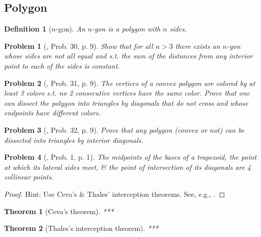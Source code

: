 \documentclass[oneside]{book}
\numberwithin{equation}{section}
\newtheorem{definition}{Definition}[section]
\newtheorem{problem}{Problem}[section]
\newtheorem{theorem}{Theorem}[section]
\begin{document}
\subsection{Polygon}

\begin{definition}[$n$-gon]
	An \emph{$n$-gon} is a polygon with $n$ sides.
\end{definition}

\begin{problem}[\cite{Gelca_Andreescu2017}, Prob. 30, p. 9]
	Show that for all $n > 3$ there exists an $n$-gon whose sides are not all equal and s.t. the sum of the distances from any interior point to each of the sides is constant.
\end{problem}

\begin{problem}[\cite{Gelca_Andreescu2017}, Prob. 31, p. 9]
	The vertices of a convex polygon are colored by at least 3 colors s.t. no 2 consecutive vertices have the same color. Prove that one can dissect the polygon into triangles by diagonals that do not cross and whose endpoints have different colors.
\end{problem}

\begin{problem}[\cite{Gelca_Andreescu2017}, Prob. 32, p. 9]
	Prove that any polygon (convex or not) can be dissected into triangles by interior diagonals.
\end{problem}

\begin{problem}[\cite{Andreescu_Mortici_Tetiva2017}, Prob. 1, p. 1]
	The midpoints of the bases of a trapezoid, the point at which its lateral sides meet, \& the point of intersection of its diagonals are 4 collinear points.
\end{problem}

\begin{proof}[Proof]
	Hint: Use Ceva's \& Thales' interception theorems. See, e.g., \cite[pp. 1--2]{Andreescu_Mortici_Tetiva2017}.
\end{proof}

\begin{theorem}[Ceva's theorem]
	***
\end{theorem}

\begin{theorem}[Thales's interception theorem]
	***
\end{theorem}
\end{document}
